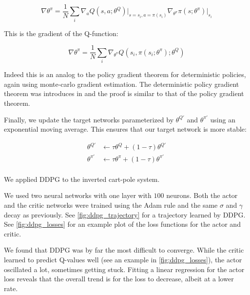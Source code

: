 \documentclass{article}
\begin{document}
    \begin{equation*}
        \nabla \theta^\pi =
            \frac{1}{N} \sum_i \nabla_a Q(s, a; \theta^Q) \big|_{s = s_i, a = \pi(s_i)} \nabla_{\theta^\pi} \pi(s; \theta^\pi) \big|_{s_i}
    \end{equation*}

    This is the gradient of the Q-function:

    \begin{equation*}
        \nabla \theta^\pi =
            \frac{1}{N} \sum_i \nabla_{\theta^\pi} Q(s_i, \pi(s_i; \theta^\pi); \theta^Q)
    \end{equation*}

    Indeed this is an analog to the policy gradient theorem for deterministic policies, again using monte-carlo gradient estimation. The deterministic policy gradient theorem was introduces in \cite{pmlr-v32-silver14} and the proof is similar to that of the policy gradient theorem.

    Finally, we update the target networks parameterized by $\theta^{Q'}$ and $\theta^{\pi'}$ using an exponential moving average. This ensures that our target network is more stable:

    \begin{align*}
        \theta^{Q'} &\gets \tau \theta^Q + (1 - \tau) \theta^{Q'} \\
        \theta^{\pi'} &\gets \tau \theta^\pi + (1 - \tau) \theta^{\pi'} \\
    \end{align*}

    We applied DDPG to the inverted cart-pole system.

    We used two neural networks with one layer with $100$ neurons. Both the actor and the critic networks were trained using the Adam rule and the same $\sigma$ and $\gamma$ decay as previously. See \autoref{fig:ddpg_trajectory} for a trajectory learned by DDPG. See \autoref{fig:ddpg_losses} for an example plot of the loss functions for the actor and critic.

    We found that DDPG was by far the most difficult to converge. While the critic learned to predict Q-values well (see an example in \autoref{fig:ddpg_losses}), the actor oscillated a lot, sometimes getting stuck. Fitting a linear regression for the actor loss reveals that the overall trend is for the loss to decrease, albeit at a lower rate.

\clearpage
\printbibliography


\clearpage
\clearpage
\end{document}
